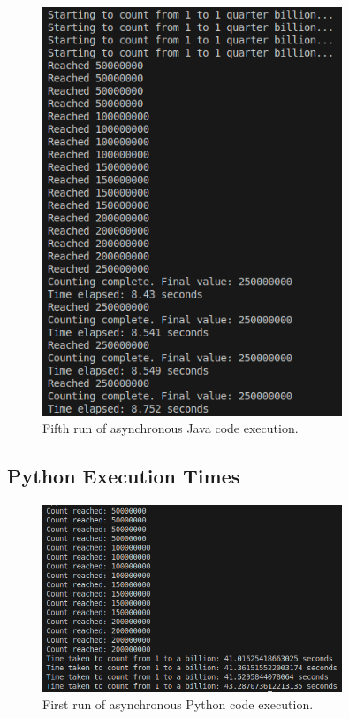 \documentclass[12pt,a4paper]{article}
\begin{document}
\begin{figure}[htbp]
    \centering
    \includegraphics[width=0.8\textwidth]{../async_records/results_java/result_5.png}
    \caption{Fifth run of asynchronous Java code execution.}
    \label{fig:Java-async-runtime-5}
\end{figure}

\clearpage
\subsection{Python Execution Times} 

\begin{figure}[htbp]
    \centering
    \includegraphics[width=0.8\textwidth]{../async_records/results_python/result_1.png}
    \caption{First run of asynchronous Python code execution.}
    \label{fig:Python-async-runtime-1}
\end{figure}
\end{document}
